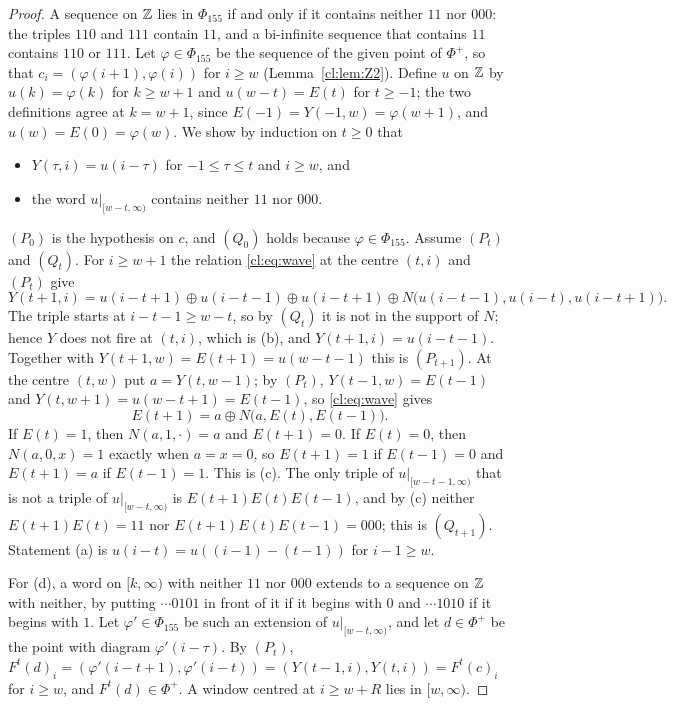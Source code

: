 \begin{proof}
A sequence on $\mathbb{Z}$ lies in $\Phi_{155}$ if and only if it contains neither $11$ nor $000$: the triples $110$ and $111$ contain $11$, and a bi-infinite sequence that contains $11$ contains $110$ or $111$. Let $\varphi\in\Phi_{155}$ be the sequence of the given point of $\Phi^+$, so that $c_i=(\varphi(i+1),\varphi(i))$ for $i\ge w$ (Lemma~\ref{cl:lem:Z2}). Define $u$ on $\mathbb{Z}$ by $u(k)=\varphi(k)$ for $k\ge w+1$ and $u(w-t)=E(t)$ for $t\ge-1$; the two definitions agree at $k=w+1$, since $E(-1)=Y(-1,w)=\varphi(w+1)$, and $u(w)=E(0)=\varphi(w)$. We show by induction on $t\ge0$ that
\begin{itemize}
\item[$(P_t)$] $Y(\tau,i)=u(i-\tau)$ for $-1\le\tau\le t$ and $i\ge w$, and
\item[$(Q_t)$] the word $u|_{[w-t,\infty)}$ contains neither $11$ nor $000$.
\end{itemize}
$(P_0)$ is the hypothesis on $c$, and $(Q_0)$ holds because $\varphi\in\Phi_{155}$. Assume $(P_t)$ and $(Q_t)$. For $i\ge w+1$ the relation \eqref{cl:eq:wave} at the centre $(t,i)$ and $(P_t)$ give
\[
Y(t+1,i)=u(i-t+1)\oplus u(i-t-1)\oplus u(i-t+1)\oplus N\bigl(u(i-t-1),u(i-t),u(i-t+1)\bigr).
\]
The triple starts at $i-t-1\ge w-t$, so by $(Q_t)$ it is not in the support of $N$; hence $Y$ does not fire at $(t,i)$, which is (b), and $Y(t+1,i)=u(i-t-1)$. Together with $Y(t+1,w)=E(t+1)=u(w-t-1)$ this is $(P_{t+1})$. At the centre $(t,w)$ put $a=Y(t,w-1)$; by $(P_t)$, $Y(t-1,w)=E(t-1)$ and $Y(t,w+1)=u(w-t+1)=E(t-1)$, so \eqref{cl:eq:wave} gives
\[
E(t+1)=a\oplus N\bigl(a,E(t),E(t-1)\bigr).
\]
If $E(t)=1$, then $N(a,1,\cdot)=a$ and $E(t+1)=0$. If $E(t)=0$, then $N(a,0,x)=1$ exactly when $a=x=0$, so $E(t+1)=1$ if $E(t-1)=0$ and $E(t+1)=a$ if $E(t-1)=1$. This is (c). The only triple of $u|_{[w-t-1,\infty)}$ that is not a triple of $u|_{[w-t,\infty)}$ is $E(t+1)E(t)E(t-1)$, and by (c) neither $E(t+1)E(t)=11$ nor $E(t+1)E(t)E(t-1)=000$; this is $(Q_{t+1})$. Statement (a) is $u(i-t)=u((i-1)-(t-1))$ for $i-1\ge w$.

For (d), a word on $[k,\infty)$ with neither $11$ nor $000$ extends to a sequence on $\mathbb{Z}$ with neither, by putting $\cdots0101$ in front of it if it begins with $0$ and $\cdots1010$ if it begins with $1$. Let $\varphi'\in\Phi_{155}$ be such an extension of $u|_{[w-t,\infty)}$, and let $d\in\Phi^+$ be the point with diagram $\varphi'(i-\tau)$. By $(P_t)$, $F^t(d)_i=(\varphi'(i-t+1),\varphi'(i-t))=(Y(t-1,i),Y(t,i))=F^t(c)_i$ for $i\ge w$, and $F^t(d)\in\Phi^+$. A window centred at $i\ge w+R$ lies in $[w,\infty)$.
\end{proof}

